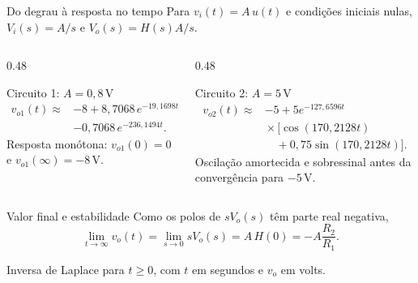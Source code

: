 \begin{frame}{Do degrau à resposta no tempo}
  \small
  \setlength{\abovedisplayskip}{4pt}
  \setlength{\belowdisplayskip}{4pt}
  Para $v_i(t)=A\,u(t)$ e condições iniciais nulas,
  $V_i(s)=A/s$ e $V_o(s)=H(s)A/s$.

  \begin{columns}[T,onlytextwidth]
    \begin{column}{0.48\textwidth}
      \begin{block}{Circuito 1: $A=0{,}8\,\mathrm{V}$}
        \[
          \begin{aligned}
            v_{o1}(t)\approx{}&-8
              +8{,}7068\,e^{-19{,}1698t}\\
              &-0{,}7068\,e^{-236{,}1494t}.
          \end{aligned}
        \]
        Resposta monótona: $v_{o1}(0)=0$ e
        $v_{o1}(\infty)=-8\,\mathrm{V}$.
      \end{block}
    \end{column}
    \begin{column}{0.48\textwidth}
      \begin{block}{Circuito 2: $A=5\,\mathrm{V}$}
        \[
          \begin{aligned}
            v_{o2}(t)\approx{}&-5+5e^{-127{,}6596t}\\
              &\!\!\times\bigl[\cos(170{,}2128t)\\
              &\quad+0{,}75\sin(170{,}2128t)\bigr].
          \end{aligned}
        \]
        Oscilação amortecida e sobressinal antes da convergência para $-5\,\mathrm{V}$.
      \end{block}
    \end{column}
  \end{columns}

  \begin{alertblock}{Valor final e estabilidade}
    Como os polos de $sV_o(s)$ têm parte real negativa,
    \[
      \lim_{t\to\infty}v_o(t)=\lim_{s\to0}sV_o(s)
      =A\,H(0)=-A\frac{R_2}{R_1}.
    \]
  \end{alertblock}
  \centering\scriptsize Inversa de Laplace para $t\geq0$, com $t$ em segundos e $v_o$ em volts.
\end{frame}
